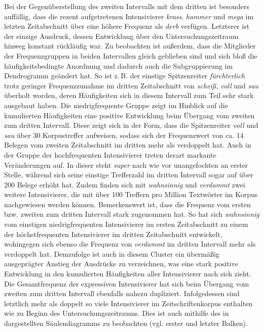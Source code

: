 
Bei der Gegenüberstellung des zweiten Intervalls mit dem dritten ist besonders auffällig, dass die rezent aufgetretenen Intensivierer \textit{krass}, \textit{hammer} und \textit{mega} im letzten Zeitabschnitt über eine höhere Frequenz als \textit{derb} verfügen. Letzterer ist der einzige Ausdruck, dessen Entwicklung über den Untersuchungszeitraum hinweg konstant rückläufig war. Zu beobachten ist außerdem, dass die Mitglieder der Frequenzgruppen in beiden Intervallen gleich geblieben sind und sich bloß die häufigkeitsbedingte Anordnung und dadurch auch die Subgruppierung im Dendrogramm geändert hat. So ist z.\,B. der einstige Spitzenreiter \textit{fürchterlich} trotz geringer Frequenzzunahme im dritten Zeitabschnitt von \textit{scheiß}, \textit{voll} und \textit{sau} überholt worden, deren Häufigkeiten sich in diesem Intervall zum Teil sehr stark ausgebaut haben. Die niedrigfrequente Gruppe zeigt im Hinblick auf die kumulierten Häufigkeiten eine positive Entwicklung beim Übergang vom zweiten zum dritten Intervall. Diese zeigt sich in der Form, dass die Spitzenreiter \textit{voll} und \textit{sau} über 30 Korpustreffer aufweisen, sodass sich der Frequenzwert von ca. 14 Belegen vom zweiten Zeitabschnitt im dritten mehr als verdoppelt hat. Auch in der Gruppe der hochfrequenten Intensivierer treten derart markante Veränderungen auf. In dieser steht \textit{super} nach wie vor unangefochten an erster Stelle, während sich seine einstige Trefferzahl im dritten Intervall sogar auf über 200 Belege erhöht hat. Zudem finden sich mit \textit{wahnsinnig} und \textit{verdammt} zwei weitere Intensivierer, die mit über 100 Treffern pro Million Textwörter im Korpus nachgewiesen werden können. Bemerkenswert ist, dass die Frequenz vom ersten bzw. zweiten zum dritten Intervall stark zugenommen hat. So hat sich \textit{wahnsinnig} vom einstigen niedrigfrequenten Intensivierer im ersten Zeitabschnitt zu einem der höchstfrequenten Intensivierer im dritten Zeitabschnitt entwickelt, wohingegen sich ebenso die Frequenz von \textit{verdammt} im dritten Intervall mehr als verdoppelt hat. Demzufolge ist auch in diesem Cluster ein übermäßig ausgeprägter Anstieg der Ausdrücke zu verzeichnen, was eine stark positive Entwicklung in den kumulierten Häufigkeiten aller Intensivierer nach sich zieht. Die Gesamtfrequenz der expressiven Intensivierer hat sich beim Übergang vom zweiten zum dritten Intervall ebenfalls nahezu dupliziert. Infolgedessen sind letztlich mehr als doppelt so viele Intensivierer im Zeitschriftenkorpus enthalten wie zu Beginn des Untersuchungszeitraums. Dies ist auch mithilfe des in  dargestellten Säulendiagramms zu beobachten (vgl. erster und letzter Balken).

